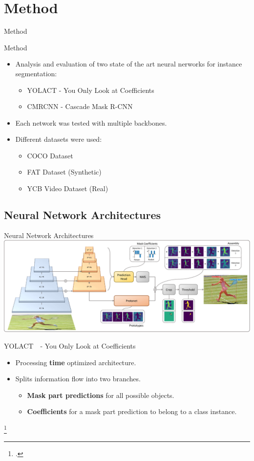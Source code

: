 \documentclass[18pt]{beamer}
\begin{document}
\section{Method}
\begin{frame}
\vfill
\centering
{\LARGE Method}
\vfill
\end{frame}

\begin{frame}{Method}
\begin{itemize}
	\item Analysis and evaluation of two state of the art neural nerworks for instance segmentation:
	\begin{itemize}
		\item YOLACT - You Only Look at Coefficients
		\item CMRCNN - Cascade Mask R-CNN
	\end{itemize}
	\item Each network was tested with multiple backbones.
    \item Different datasets were used:
    \begin{itemize}
        \item COCO Dataset
        \item FAT Dataset (Synthetic) 
        \item YCB Video Dataset (Real)
    \end{itemize}
\end{itemize}
\end{frame}

\subsection{Neural Network Architectures}
\begin{frame}{Neural Network Architectures}
\centering
\includegraphics[height=0.45\textheight]{figures/yolact_architecture.png}
\begin{block}{YOLACT~\footnotemark~- You Only Look at Coefficients}
	\begin{itemize}
		\item Processing \textbf{time} optimized architecture.
		\item Splits information flow into two branches.
		\begin{itemize}
			\item \textbf{Mask part predictions} for all possible objects.
			\item \textbf{Coefficients} for a mask part prediction to belong to a class instance.
		\end{itemize}
	\end{itemize}
\end{block}
\footcitetext{Bolya:2019aa}
\end{frame}
\end{document}

